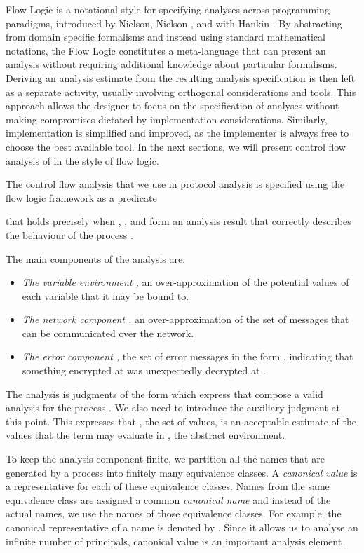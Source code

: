 Flow Logic is a notational style for specifying analyses across
programming paradigms, introduced by Nielson, Nielson 
\cite{flow:1,flow:2,flow:3}, and with Hankin
\cite{nie:nie:han}. 
By abstracting from domain
specific formalisms and instead using standard mathematical notations, the Flow
Logic constitutes a meta-language that can present an analysis without requiring
additional knowledge about particular formalisms. Deriving an analysis estimate
from the resulting analysis specification is then left as a separate activity, usually
involving orthogonal considerations and tools.
This approach allows the designer to focus on the specification of analyses without
making compromises dictated by implementation considerations. Similarly,
implementation is simplified and improved, as the implementer is always free to
choose the best available tool. In the next sections, we will present
control flow analysis of \LYSA in the style of flow logic.

The control flow analysis that we use in protocol analysis is specified using the flow logic framework as a predicate
\begin{center}\end{center}
that holds precisely when , , and   form an analysis result that correctly
describes the behaviour of the process . 

The main components of the analysis are:
\begin{itemize}
\item \emph{The variable environment ,} an over-approximation of the potential values of each variable that it may be bound to.
\item \emph{The network component ,} an over-approximation of the set of messages that can be communicated over the network.
\item \emph{The error component ,} the set of error messages in the form , indicating that something encrypted at  was unexpectedly decrypted at  .
\end{itemize}



The analysis is judgments of the form   which express that  compose a valid analysis for the process . We also need to introduce the auxiliary judgment  at this point. This expresses that , the set of values, is an acceptable estimate of the values that the term  may evaluate in , the abstract environment.

\label{lys:can}To keep the analysis component finite, we partition all the names that are generated by a \LYSA process into finitely many equivalence classes.
A \emph{canonical value} is a representative for each of these equivalence classes. 
Names from the same equivalence class are assigned a common \emph{canonical name} and instead of the actual names, we use the names of those equivalence classes.
For example, the canonical representative of a name  is denoted by .
Since it allows us to analyse an infinite number of principals, canonical value is an important analysis element \cite{buc:nie}.

